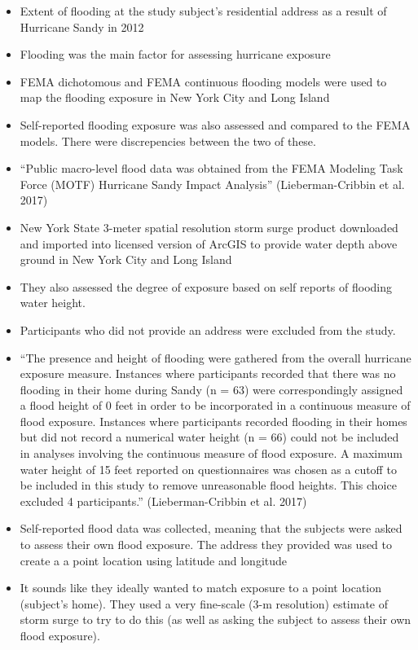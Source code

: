 \documentclass[
]{article}
\providecommand{\tightlist}{%
  \setlength{\itemsep}{0pt}\setlength{\parskip}{0pt}}
\begin{document}
\begin{itemize}
\tightlist
\item
  Extent of flooding at the study subject's residential address as a
  result of Hurricane Sandy in 2012
\item
  Flooding was the main factor for assessing hurricane exposure
\item
  FEMA dichotomous and FEMA continuous flooding models were used to map
  the flooding exposure in New York City and Long Island
\item
  Self-reported flooding exposure was also assessed and compared to the
  FEMA models. There were discrepencies between the two of these.
\item
  ``Public macro-level flood data was obtained from the FEMA Modeling
  Task Force (MOTF) Hurricane Sandy Impact Analysis'' (Lieberman-Cribbin
  et al. 2017)
\item
  New York State 3-meter spatial resolution storm surge product
  downloaded and imported into licensed version of ArcGIS to provide
  water depth above ground in New York City and Long Island
\item
  They also assessed the degree of exposure based on self reports of
  flooding water height.
\item
  Participants who did not provide an address were excluded from the
  study.
\item
  ``The presence and height of flooding were gathered from the overall
  hurricane exposure measure. Instances where participants recorded that
  there was no flooding in their home during Sandy (n = 63) were
  correspondingly assigned a flood height of 0 feet in order to be
  incorporated in a continuous measure of flood exposure. Instances
  where participants recorded flooding in their homes but did not record
  a numerical water height (n = 66) could not be included in analyses
  involving the continuous measure of flood exposure. A maximum water
  height of 15 feet reported on questionnaires was chosen as a cutoff to
  be included in this study to remove unreasonable flood heights. This
  choice excluded 4 participants.'' (Lieberman-Cribbin et al. 2017)
\item
  Self-reported flood data was collected, meaning that the subjects were
  asked to assess their own flood exposure. The address they provided
  was used to create a a point location using latitude and longitude
\item
  It sounds like they ideally wanted to match exposure to a point
  location (subject's home). They used a very fine-scale (3-m
  resolution) estimate of storm surge to try to do this (as well as
  asking the subject to assess their own flood exposure).
\end{itemize}
\end{document}
